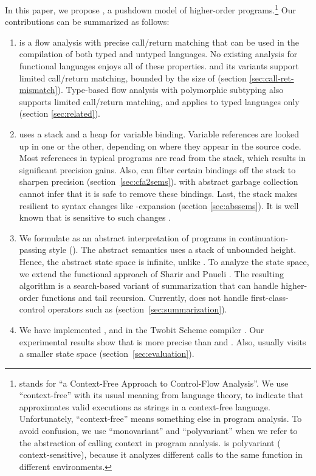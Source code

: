 \documentclass{LMCS}
\theoremstyle{definition} \newtheorem{property}[thm]{Property}
\begin{document}
In this paper, we propose \cfat{}, a pushdown model of higher-order 
programs.\footnote{\cfat{} stands for 
``a Context-Free Approach to Control-Flow Analysis''.
We use ``context-free'' with its usual meaning from language theory, to indicate
that \cfat{} approximates valid executions as strings in a context-free 
language.
Unfortunately, ``context-free'' means something else in program analysis.
To avoid confusion, we use ``monovariant'' and ``polyvariant'' when we refer to
the abstraction of calling context in program analysis.
\cfat{} is polyvariant (\aka{} context-sensitive), because it analyzes different
calls to the same function in different environments.
}
Our contributions can be summarized as follows:
\begin{enumerate}[]
\item
  \cfat{} is a flow analysis with precise call/return matching that can be used
  in the compilation of both typed and untyped languages.
  No existing analysis for functional languages enjoys all of these properties.
  \kcfa{} and its variants support lim\-it\-ed call/return matching, bounded by 
  the size of  (section \ref{sec:call-ret-mismatch}).
  Type-based flow analysis with polymorphic subtyping \cite{diss/diku/96/mossin,
    conf/popl/01/rehof/typeflow} also supports limited call/return matching, and
  applies to typed languages only (section \ref{sec:related}).
\item  
  \cfat{} uses a stack and a heap for variable binding.
  Variable references are looked up in one or the other, depending on where they
  appear in the source code.
  Most ref\-er\-ences in typical programs are read from the stack, which results
  in significant pre\-ci\-sion gains. 
  Also, \cfat{} can filter certain bindings off the stack to sharpen 
  pre\-ci\-sion (section~\ref{sec:cfa2sems}).
  \kcfa{} with abstract garbage collection \cite{conf/icfp/06/might/gcfa}
  cannot infer that it is safe to remove these bindings.
  Last, the stack makes \cfat{} resilient to syntax changes like 
  -expansion (section \ref{sec:abssems}).
  It is well known that \kcfa{} is sensitive to such changes
  \cite{journal/toplas/98/wright/polysplit, conf/icfp/08/vanhorn/kcfa}.
\item
  We formulate \cfat{} as an abstract interpretation of programs in 
  continuation-passing style (\cps{}).
  The abstract semantics uses a stack of unbounded height.
  Hence, the abstract state space is infinite, unlike \kcfa{}.
  To analyze the state space, we extend the functional approach of Sharir and
  Pnueli \cite{book/flowanalysis/81/sharir/interproc}.
  The resulting algorithm is a search-based variant of summarization that can
  handle higher-order functions and tail recursion.
  Currently, \cfat{} does not handle first-class-control operators such 
  as  (section~\ref{sec:summarization}).
\item
  We have implemented ,  and \cfat{} in the Twobit Scheme 
  compiler \cite{conf/lfp/94/clinger/larceny}.
  Our experimental results show that \cfat{} is more precise than  and 
  .
  Also, \cfat{} usually visits a smaller state space 
  (section~\ref{sec:evaluation}).
\end{enumerate}
\end{document}
